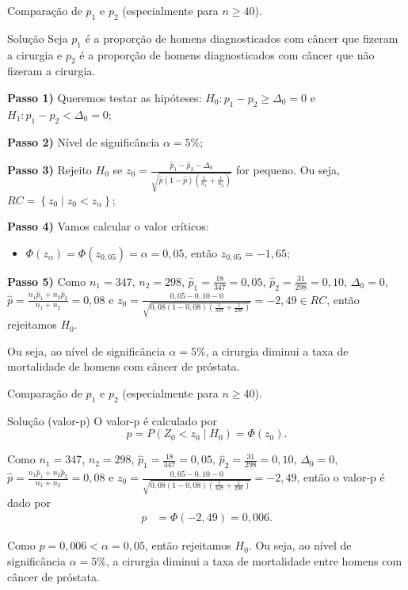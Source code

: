 \documentclass[9pt]{beamer}
\begin{document}
\begin{frame}{Comparação de $p_1$ e $p_2$ (especialmente para $n 
	\geq 40$).}

	\begin{block}{Solução}
		Seja $p_1$ é a proporção de homens diagnosticados com câncer que fizeram a cirurgia e $p_2$ é a proporção de homens diagnosticados com câncer que não fizeram a cirurgia.
		
		\textbf{Passo 1)} Queremos testar as hipóteses: $H_0: p_1 - p_2 \geq \Delta_0=0$ e $H_1: p_1 - p_2 < \Delta_0=0$;
		
		\textbf{Passo 2)} Nível de significância $\alpha=5\%$;
		
		\textbf{Passo 3)} Rejeito $H_0$ se $z_0 = \frac{\hat{p}_1 - \hat{p}_2 -\Delta_0}{\sqrt{\hat{p}(1-\hat{p}) \left( \frac{1}{n_1} + \frac{1}{n_2} \right)}}$ for pequeno. Ou seja, $RC = \left\{ z_0 \mid z_0 < z_\alpha \right\}$;
		
		\textbf{Passo 4)} Vamos calcular o valor críticos:
		\begin{itemize}
			\item $\Phi\left(z_\alpha\right) = \Phi\left(z_{0,05}\right) = \alpha = 0,05$, então $z_{0,05} = -1,65$;
		\end{itemize}
	
		\textbf{Passo 5)} Como $n_1=347$, $n_2 = 298$, $\hat{p}_1 = \frac{18}{347} = 0,05$, $\hat{p}_2 = \frac{31}{298} = 0,10$, $\Delta_0=0$, $\hat{p} = \frac{n_1 \hat{p}_1 + n_2 \hat{p}_2}{n_1 + n_2}=0,08$ e $z_0 = \frac{0,05 - 0,10 -0}{\sqrt{0,08(1-0,08) \left( \frac{1}{347} + \frac{1}{298} \right)}} = -2,49 \in RC$, então rejeitamos $H_0$. 
		
		Ou seja, ao nível de significância $\alpha=5\%$, a cirurgia diminui a taxa de mortalidade de homens com câncer de próstata.
	\end{block}

\end{frame}

\begin{frame}{Comparação de $p_1$ e $p_2$ (especialmente para $n 
	\geq 40$).}

\begin{block}{Solução (valor-p)}
	O valor-p é calculado por
	$$p = P(Z_0 < z_0 \mid H_0) = \Phi\left( z_0 \right).$$
	
	Como $n_1=347$, $n_2 = 298$, $\hat{p}_1 = \frac{18}{347} = 0,05$, $\hat{p}_2 = \frac{31}{298} = 0,10$, $\Delta_0=0$, $\hat{p} = \frac{n_1 \hat{p}_1 + n_2 \hat{p}_2}{n_1 + n_2}=0,08$ e $z_0 = \frac{0,05 - 0,10 -0}{\sqrt{0,08(1-0,08) \left( \frac{1}{347} + \frac{1}{298} \right)}} = -2,49$, então o valor-p é dado por
	\begin{align*}
		p &= \Phi\left( -2,49 \right) = 0,006.
	\end{align*}
	
	Como $p=0,006 < \alpha = 0,05$, então rejeitamos $H_0$. Ou seja, ao nível de significância $\alpha=5\%$, a cirurgia diminui a taxa de mortalidade entre homens com câncer de próstata.
\end{block}

\end{frame}
\end{document}
